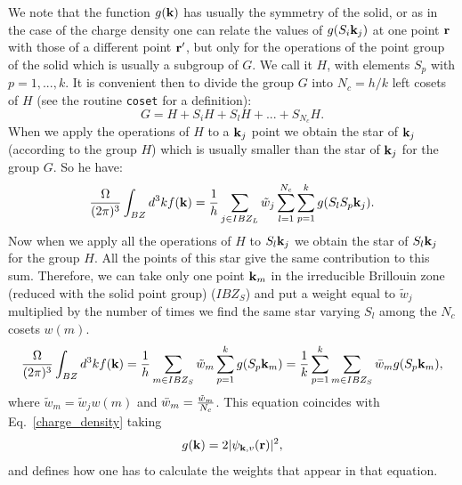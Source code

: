 \documentclass[12pt,a4paper,twoside]{report}
\begin{document}
We note that the function $g({\bf k})$ has usually the symmetry of
the solid, or as in the case of the charge density one can relate the values
of $g(S_i {\bf k}_j)$ at one point ${\bf r}$ with those of a different
point ${\bf r}'$, but only for the operations of the point group of the 
solid which is usually a subgroup of $G$. We call it $H$, with elements 
$S_p$ with $p=1,...,k$. 
It is convenient then to divide the group $G$ into $N_c=h/k$ left cosets 
of $H$ (see the
routine \texttt{coset} for a definition):
\begin{equation}
G= H + S_i H + S_l H +...+ S_{N_c} H.
\end{equation}
When we apply the operations of $H$ to a ${\bf k}_j$ point we obtain the
star of ${\bf k}_j$ (according to the group $H$) which is usually smaller than
the star of ${\bf k}_j$ for the group $G$.
So he have:
\begin{equation}
{\Omega \over (2\pi)^3} \int_{BZ} d^3k f({\bf k}) =
{1\over h} \sum_{j\in IBZ_L} \tilde w_j \sum_{l=1}^{N_c}\sum_{p=1}^k g(S_l S_p {\bf k}_j).
\end{equation}
Now when we apply all the operations of $H$ to $S_l {\bf k}_j$ we obtain
the star of $S_l {\bf k}_j$ for the group $H$. All the points of this star 
give the same contribution to this sum. Therefore, we can take only 
one point ${\bf k}_m$ in the irreducible Brillouin zone (reduced with 
the solid point group)
($IBZ_S$) and put a weight equal to $\tilde w_j$ multiplied by the number 
of times we find the same star varying $S_l$ among the $N_c$ cosets $w(m)$.
\begin{equation}
{\Omega \over (2\pi)^3} \int_{BZ} d^3k f({\bf k}) =
{1\over h} \sum_{m\in IBZ_S} \tilde w_m \sum_{p=1}^k g(S_p {\bf k}_m) =
{1\over k} \sum_{p=1}^k \sum_{m\in IBZ_S} \bar w_m g(S_p {\bf k}_m),
\end{equation}
where $\tilde w_m = \tilde w_j w(m)$ and $\bar w_m = {\tilde w_m \over N_c}$.
This equation coincides with Eq.~\ref{charge_density} taking 
\begin{equation}
g({\bf k})= 2 |\psi_{{\bf k}, v} ({\bf r}) |^2,
\end{equation}
and defines how one has to calculate the weights that appear in that equation.
\end{document}
